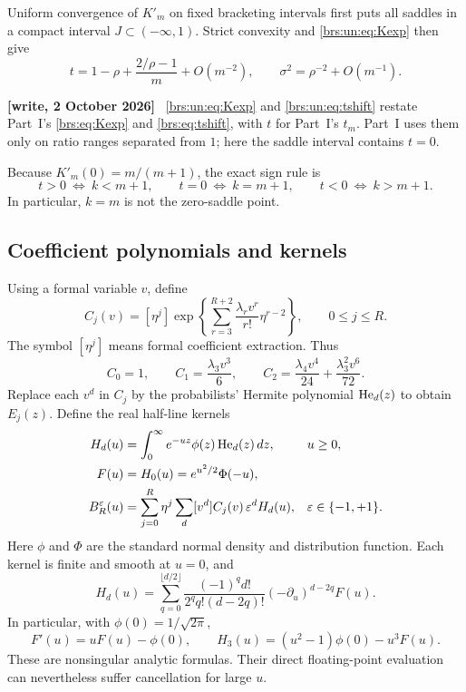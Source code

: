 \documentclass[11pt]{article}
\numberwithin{equation}{section}
\theoremstyle{remark}\newtheorem{remark}[theorem]{Remark}
\newenvironment{writenote}{\par\smallskip\begingroup\small\noindent\textbf{[write, 2 October 2026]}\ }{\par\endgroup\smallskip}
\begin{document}
Uniform convergence of $K'_m$ on fixed bracketing intervals first puts
all saddles in a compact interval $J\subset(-\infty,1)$.  Strict
convexity and \eqref{brs:un:eq:Kexp} then give
\begin{equation}\label{brs:un:eq:tshift}
 t=1-\rho+\frac{2/\rho-1}{m}+O(m^{-2}),\qquad
 \sigma^2=\rho^{-2}+O(m^{-1}).
\end{equation}

\begin{writenote}
\eqref{brs:un:eq:Kexp} and \eqref{brs:un:eq:tshift} restate Part~I's \eqref{brs:eq:Kexp} and \eqref{brs:eq:tshift}, with $t$ for Part~I's $t_m$. Part~I uses them only on ratio ranges separated from $1$; here the saddle interval contains $t=0$.
\end{writenote}
Because $K'_m(0)=m/(m+1)$, the exact sign rule is
\begin{equation}\label{brs:un:eq:switch}
 t>0\ \Longleftrightarrow\ k<m+1,\qquad
 t=0\ \Longleftrightarrow\ k=m+1,\qquad
 t<0\ \Longleftrightarrow\ k>m+1.
\end{equation}
In particular, $k=m$ is not the zero-saddle point.

\subsection{Coefficient polynomials and kernels}

Using a formal variable $v$, define
\begin{equation}\label{brs:un:eq:C}
 C_j(v)=[\eta^j]\exp\left\{
   \sum_{r=3}^{R+2}\frac{\lambda_r v^r}{r!}\eta^{r-2}
                         \right\},\qquad 0\le j\le R.
\end{equation}
The symbol $[\eta^j]$ means formal coefficient extraction.  Thus
\[
 C_0=1,\qquad C_1=\frac{\lambda_3v^3}{6},\qquad
 C_2=\frac{\lambda_4v^4}{24}+\frac{\lambda_3^2v^6}{72}.
\]
Replace each $v^d$ in $C_j$ by the probabilists' Hermite polynomial
$\operatorname{He}_d(z)$ to obtain $E_j(z)$.  Define the real half-line kernels
\begin{align}\label{brs:un:eq:kernels}
 H_d(u)&=\int_0^\infty e^{-uz}\phi(z)\operatorname{He}_d(z)\,dz,
                    &&u\ge0,\\
 F(u)&=H_0(u)=e^{u^2/2}\Phi(-u),\nonumber\\
 B_R^\varepsilon(u)&=\sum_{j=0}^R\eta^j
             \sum_d [v^d]C_j(v)\,\varepsilon^d H_d(u),
                    &&\varepsilon\in\{-1,+1\}.\nonumber
\end{align}
Here $\phi$ and $\Phi$ are the standard normal density and distribution
function.  Each kernel is finite and smooth at $u=0$, and
\begin{equation}\label{brs:un:eq:derivatives}
 H_d(u)=\sum_{q=0}^{\lfloor d/2\rfloor}
 \frac{(-1)^q d!}{2^q q!(d-2q)!}
 (-\partial_u)^{d-2q}F(u).
\end{equation}
In particular, with $\phi(0)=1/\sqrt{2\pi}$,
\begin{equation}\label{brs:un:eq:H3}
 F'(u)=uF(u)-\phi(0),\qquad
 H_3(u)=(u^2-1)\phi(0)-u^3F(u).
\end{equation}
These are nonsingular analytic formulas.  Their direct floating-point
evaluation can nevertheless suffer cancellation for large $u$.
\end{document}
